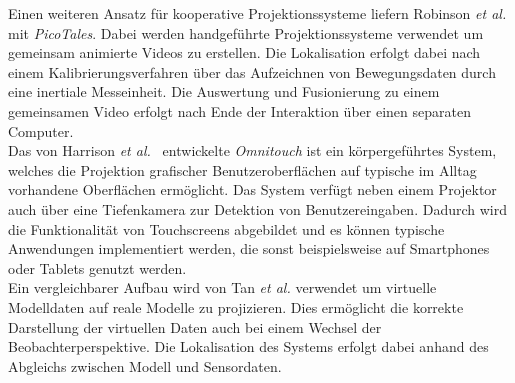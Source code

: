 Einen weiteren Ansatz für kooperative Projektionssysteme liefern Robinson \textit{et al.} \cite{Robinson2012} mit \textit{PicoTales}. Dabei werden handgeführte Projektionssysteme verwendet um gemeinsam animierte Videos zu erstellen. Die Lokalisation erfolgt dabei nach einem Kalibrierungsverfahren über das Aufzeichnen von Bewegungsdaten durch eine inertiale Messeinheit. Die Auswertung und Fusionierung zu einem gemeinsamen Video erfolgt nach Ende der Interaktion über einen separaten Computer.\\
Das von Harrison \textit{et al.\ }\cite{Harrison2011} entwickelte \textit{Omnitouch} ist ein körpergeführtes System, welches die Projektion grafischer Benutzeroberflächen auf typische im Alltag vorhandene Oberflächen ermöglicht. Das System verfügt neben einem Projektor auch über eine Tiefenkamera zur Detektion von Benutzereingaben. Dadurch wird die Funktionalität von Touchscreens abgebildet und es können typische Anwendungen implementiert werden, die sonst beispielsweise auf Smartphones oder Tablets genutzt werden.\\
Ein vergleichbarer Aufbau wird von Tan \textit{et al.} \cite{Tan2013} verwendet um virtuelle Modelldaten auf reale Modelle zu projizieren. Dies ermöglicht die korrekte Darstellung der virtuellen Daten auch bei einem Wechsel der Beobachterperspektive. Die Lokalisation des Systems erfolgt dabei anhand des Abgleichs zwischen Modell und Sensordaten.\\



